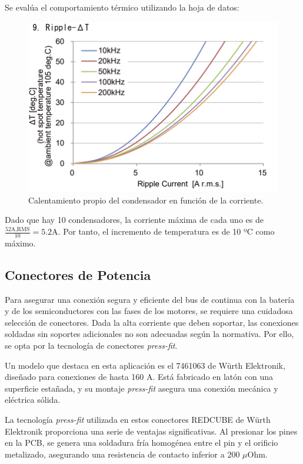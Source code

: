 Se evalúa el comportamiento térmico utilizando la hoja de datos:
\begin{figure}[H]
	\centering
	\includegraphics[width=0.7\linewidth]{fig/dc-link-temp}
	\caption{Calentamiento propio del condensador en función de la corriente.}
\end{figure}

Dado que hay 10 condensadores, la corriente máxima de cada uno es de $\frac{52 \text{A,RMS}}{10} = 5.2 \text{A}$. Por tanto, el incremento de temperatura es de 10 ºC como máximo.

\subsection{Conectores de Potencia}

Para asegurar una conexión segura y eficiente del bus de continua con la batería y de los semiconductores con las fases de los motores, se requiere una cuidadosa selección de conectores. Dada la alta corriente que deben soportar, las conexiones soldadas sin soportes adicionales no son adecuadas según la normativa. Por ello, se opta por la tecnología de conectores \textit{press-fit}.

Un modelo que destaca en esta aplicación es el 7461063 de Würth Elektronik, diseñado para conexiones de hasta 160 A. Está fabricado en latón con una superficie estañada, y su montaje \textit{press-fit} asegura una conexión mecánica y eléctrica sólida.

La tecnología \textit{press-fit} utilizada en estos conectores REDCUBE de Würth Elektronik proporciona una serie de ventajas significativas. Al presionar los pines en la PCB, se genera una soldadura fría homogénea entre el pin y el orificio metalizado, asegurando una resistencia de contacto inferior a 200 $\mu$Ohm.

